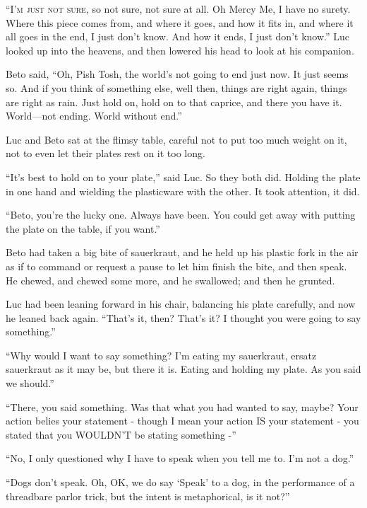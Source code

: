 
\lettrine{``I}{'m just not sure,} so not sure, not sure at all. Oh Mercy Me, I have
no surety. Where this piece comes from, and where it goes, and how it
fits in, and where it all goes in the end, I just don't know. And how it
ends, I just don't know.'' Luc looked up into the heavens, and then
lowered his head to look at his companion.

Beto said, ``Oh, Pish Tosh, the world's not going to end just now. It
just seems so. And if you think of something else, well then, things are
right again, things are right as rain. Just hold on, hold on to that
caprice, and there you have it. World---not ending. World without end.''

Luc and Beto sat at the flimsy table, careful not to put too much weight
on it, not to even let their plates rest on it too long.

``It's best to hold on to your plate,'' said Luc. So they both did.
Holding the plate in one hand and wielding the plasticware with the
other. It took attention, it did.

``Beto, you're the lucky one. Always have been. You could get away with
putting the plate on the table, if you want.''

Beto had taken a big bite of sauerkraut, and he held up his plastic fork
in the air as if to command or request a pause to let him finish the
bite, and then speak. He chewed, and chewed some more, and he swallowed;
and then he grunted.

Luc had been leaning forward in his chair, balancing his plate
carefully, and now he leaned back again. ``That's it, then? That's it? I
thought you were going to say something.''

``Why would I want to say something? I'm eating my sauerkraut, ersatz
sauerkraut as it may be, but there it is. Eating and holding my plate.
As you said we should.''

``There, you said something. Was that what you had wanted to say, maybe?
Your action belies your statement - though I mean your action IS your
statement - you stated that you WOULDN'T be stating something -''

``No, I only questioned why I have to speak when you tell me to. I'm not
a dog.''

``Dogs don't speak. Oh, OK, we do say `Speak' to a dog, in the
performance of a threadbare parlor trick, but the intent is
metaphorical, is it not?''

